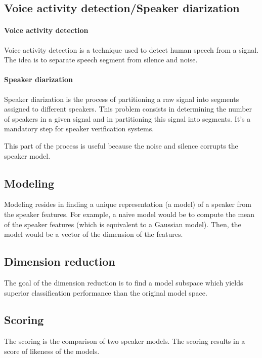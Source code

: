 \documentclass{techrep}
\begin{document}
\subsection{Voice activity detection/Speaker diarization}

\paragraph{Voice activity detection} Voice activity detection is a technique used to detect human speech from a signal.
The idea is to separate speech segment from silence and noise.

\paragraph{Speaker diarization} Speaker diarization is the process of partitioning a raw signal into segments assigned to different speakers. This problem consists in determining the number of speakers in a given signal
and in partitioning this signal into segments. It's a mandatory step for speaker verification systems.

This part of the process is useful because the noise and silence corrupts the speaker model.

\subsection{Modeling}

Modeling resides in finding a unique representation (a model) of a
speaker from the speaker features.  For example, a naive model would be
to compute the mean of the speaker features (which is equivalent to a
Gaussian model). Then, the model would be a vector of the dimension of
the features.

\subsection{Dimension reduction}

The goal of the dimension reduction is to find a model subspace which yields
superior classification performance than the original model space.

\subsection{Scoring}

The scoring is the comparison of two speaker models. The scoring
results in a score of likeness of the models.
\end{document}
